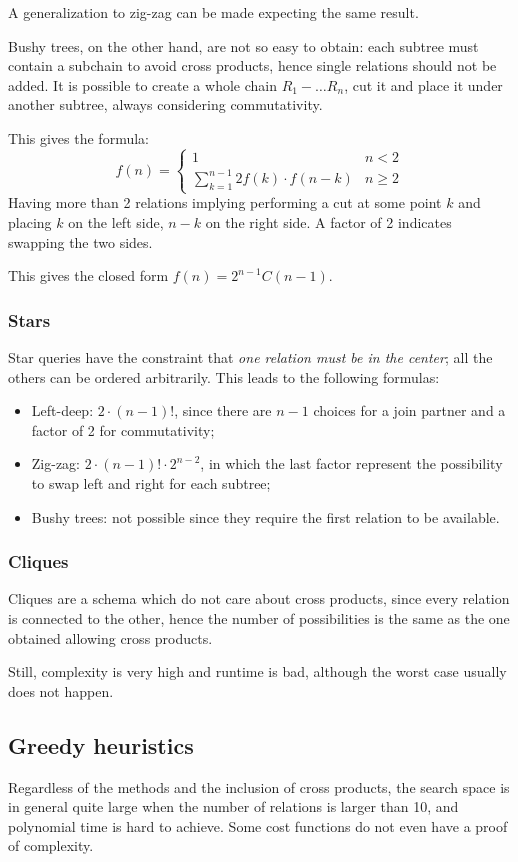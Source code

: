A generalization to zig-zag can be made expecting the same result.

Bushy trees, on the other hand, are not so easy to obtain: each subtree must contain a subchain to avoid cross products, hence single relations should not be added. It is possible to create a whole chain $R_1 - \dots R_n$, cut it and place it under another subtree, always considering commutativity.

This gives the formula:
$$ f(n) = \begin{cases}
1 & n < 2 \\
\sum_{k=1}^{n-1} 2f(k) \cdot f(n-k) & n \geq 2
\end{cases}$$
Having more than 2 relations implying performing a cut at some point $k$ and placing $k$ on the left side, $n - k$ on the right side. A factor of 2 indicates swapping the two sides. 

This gives the closed form $f(n) = 2^{n-1}C(n-1)$.

\subsubsection{Stars}
Star queries have the constraint that \textit{one relation must be in the center}; all the others can be ordered arbitrarily. This leads to the following formulas:
\begin{itemize}
	\item Left-deep: $2 \cdot (n - 1)!$, since there are $n - 1$ choices for a join partner and a factor of 2 for commutativity;
	\item Zig-zag: $2 \cdot (n - 1)! \cdot 2^{n-2}$, in which the last factor represent the possibility to swap left and right for each subtree;
	\item Bushy trees: not possible since they require the first relation to be available. 
\end{itemize}

\subsubsection{Cliques}
Cliques are a schema which do not care about cross products, since every relation is connected to the other, hence the number of possibilities is the same as the one obtained allowing cross products. 

Still, complexity is very high and runtime is bad, although the worst case usually does not happen. 

\subsection{Greedy heuristics}
Regardless of the methods and the inclusion of cross products, the search space is in general quite large when the number of relations is larger than 10, and polynomial time is hard to achieve. Some cost functions do not even have a proof of complexity.

